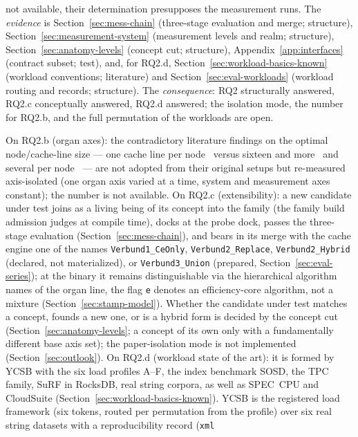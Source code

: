 \begin{nurlang}
not available, their determination presupposes the measurement runs. The \emph{evidence} is
Section~\ref{sec:mess-chain} (three-stage evaluation and merge; structure),
Section~\ref{sec:measurement-system} (measurement levels and realm; structure),
Section~\ref{sec:anatomy-levels} (concept cut; structure), Appendix~\ref{app:interfaces} (contract
subset; test), and, for RQ2.d, Section~\ref{sec:workload-basics-known} (workload conventions;
literature) and Section~\ref{sec:eval-workloads} (workload routing and records; structure). The
\emph{consequence}: RQ2 structurally answered, RQ2.c conceptually answered, RQ2.d answered; the
isolation mode, the number for RQ2.b, and the full permutation of the workloads are open.
\end{nurlang}
\begin{nurkurz}
On RQ2.b (organ axes): the contradictory literature findings on the optimal node/cache-line size --- one
cache line per node~\cite{rao1999css,rao2000csb} versus sixteen and more~\cite{hankins2003nodesize} and
several per node~\cite{chen2001prefetch} --- are not adopted from their original setups but re-measured
axis-isolated (one organ axis varied at a time, system and measurement axes constant); the number is not
available. On RQ2.c (extensibility): a new candidate under test joins as a living being of its concept into
the family (the family build admission judges at compile time), docks at the probe dock, passes the
three-stage evaluation (Section~\ref{sec:mess-chain}), and bears in its merge with the cache engine one of
the names \texttt{Verbund1\_CeOnly}, \texttt{Verbund2\_Replace}, \texttt{Verbund2\_Hybrid} (declared, not
materialized), or \texttt{Verbund3\_Union} (prepared, Section~\ref{sec:eval-series}); at the binary it
remains distinguishable via the hierarchical algorithm names of the organ line, the flag \texttt{e} denotes
an efficiency-core algorithm, not a mixture (Section~\ref{sec:stamp-model}). Whether the candidate under
test matches a concept, founds a new one, or is a hybrid form is decided by the concept cut
(Section~\ref{sec:anatomy-levels}; a concept of its own only with a fundamentally different base axis set);
the paper-isolation mode is not implemented (Section~\ref{sec:outlook}). On RQ2.d (workload state of the
art): it is formed by YCSB with the six load profiles A--F, the index benchmark SOSD, the TPC family, SuRF
in RocksDB, real string corpora, as well as SPEC~CPU and CloudSuite
(Section~\ref{sec:workload-basics-known}). YCSB is the registered load framework (six tokens, routed per
permutation from the profile) over six real string datasets with a reproducibility record (\texttt{xml}

\end{nurkurz}
